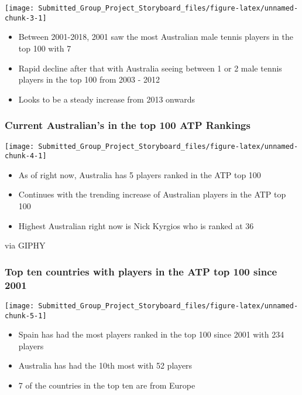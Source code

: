 \documentclass[]{article}
\providecommand{\tightlist}{%
  \setlength{\itemsep}{0pt}\setlength{\parskip}{0pt}}
\begin{document}
\begin{center}\texttt{[image: Submitted\_Group\_Project\_Storyboard\_files/figure-latex/unnamed-chunk-3-1]} \end{center}

\begin{itemize}
\tightlist
\item
  Between 2001-2018, 2001 saw the most Australian male tennis players in
  the top 100 with 7
\item
  Rapid decline after that with Australia seeing between 1 or 2 male
  tennis players in the top 100 from 2003 - 2012
\item
  Looks to be a steady increase from 2013 onwards
\end{itemize}

\subsubsection{Current Australian's in the top 100 ATP
Rankings}\label{current-australians-in-the-top-100-atp-rankings}

\begin{center}\texttt{[image: Submitted\_Group\_Project\_Storyboard\_files/figure-latex/unnamed-chunk-4-1]} \end{center}

\begin{itemize}
\tightlist
\item
  As of right now, Australia has 5 players ranked in the ATP top 100
\item
  Continues with the trending increase of Australian players in the ATP
  top 100
\item
  Highest Australian right now is Nick Kyrgios who is ranked at 36
\end{itemize}

via GIPHY

\subsubsection{Top ten countries with players in the ATP top 100 since
2001}\label{top-ten-countries-with-players-in-the-atp-top-100-since-2001}

\begin{center}\texttt{[image: Submitted\_Group\_Project\_Storyboard\_files/figure-latex/unnamed-chunk-5-1]} \end{center}

\begin{itemize}
\tightlist
\item
  Spain has had the most players ranked in the top 100 since 2001 with
  234 players
\item
  Australia has had the 10th most with 52 players
\item
  7 of the countries in the top ten are from Europe
\end{itemize}
\end{document}
